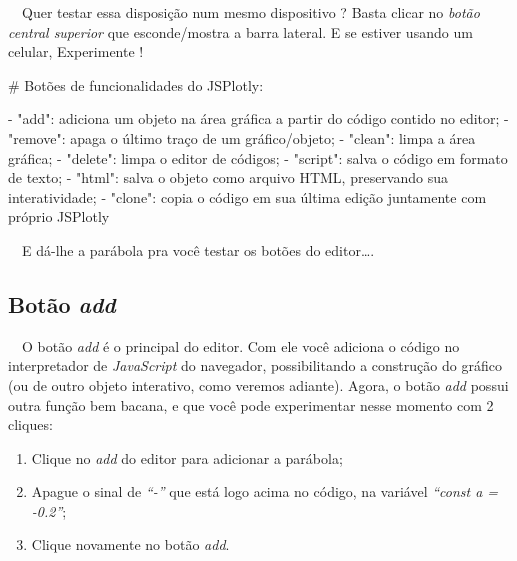 \documentclass[
  portuguese,
  letterpaper,
  DIV=11,
  numbers=noendperiod]{scrreprt}
\newenvironment{Shaded}{\begin{snugshade}}{\end{snugshade}}
\newcommand{\CommentTok}[1]{\textcolor[rgb]{0.37,0.37,0.37}{#1}}
\newcommand{\NormalTok}[1]{\textcolor[rgb]{0.00,0.23,0.31}{#1}}
\newcommand{\SpecialCharTok}[1]{\textcolor[rgb]{0.37,0.37,0.37}{#1}}
\newcommand{\StringTok}[1]{\textcolor[rgb]{0.13,0.47,0.30}{#1}}
\providecommand{\tightlist}{%
  \setlength{\itemsep}{0pt}\setlength{\parskip}{0pt}}
\begin{document}
~~Quer testar essa disposição num mesmo dispositivo ? Basta clicar no
\emph{botão central superior} que esconde/mostra a barra lateral. E se
estiver usando um celular, Experimente !

\begin{Shaded}
\begin{Highlighting}[]
\CommentTok{\# Botões de funcionalidades do JSPlotly:}

\SpecialCharTok{{-}} \StringTok{"add"}\SpecialCharTok{:}\NormalTok{ adiciona um objeto na área gráfica a partir do código contido no }
\NormalTok{   editor;}
\SpecialCharTok{{-}} \StringTok{"remove"}\SpecialCharTok{:}\NormalTok{ apaga o último traço de um gráfico}\SpecialCharTok{/}\NormalTok{objeto;}
\SpecialCharTok{{-}} \StringTok{"clean"}\SpecialCharTok{:}\NormalTok{ limpa a área gráfica;}
\SpecialCharTok{{-}} \StringTok{"delete"}\SpecialCharTok{:}\NormalTok{ limpa o editor de códigos;}
\SpecialCharTok{{-}} \StringTok{"script"}\SpecialCharTok{:}\NormalTok{ salva o código em formato de texto;}
\SpecialCharTok{{-}} \StringTok{"html"}\SpecialCharTok{:}\NormalTok{ salva o objeto como arquivo HTML, preservando sua interatividade;}
\SpecialCharTok{{-}} \StringTok{"clone"}\SpecialCharTok{:}\NormalTok{ copia o código em sua última edição juntamente com próprio JSPlotly}
\end{Highlighting}
\end{Shaded}

\hfill\break

~~E dá-lhe a parábola pra você testar os botões do editor\ldots.

\hfill\break

\hfill\break

\subsection{\texorpdfstring{Botão
\emph{add}}{Botão add}}\label{botuxe3o-add}

~~O botão \emph{add} é o principal do editor. Com ele você adiciona o
código no interpretador de \emph{JavaScript} do navegador,
possibilitando a construção do gráfico (ou de outro objeto interativo,
como veremos adiante). Agora, o botão \emph{add} possui outra função bem
bacana, e que você pode experimentar nesse momento com 2 cliques:

\hfill\break

\begin{enumerate}
\def\labelenumi{\arabic{enumi}.}
\tightlist
\item
  Clique no \emph{add} do editor para adicionar a parábola;
\item
  Apague o sinal de \emph{``-''} que está logo acima no código, na
  variável \emph{``const a = -0.2''};
\item
  Clique novamente no botão \emph{add}.\\
\end{enumerate}
\end{document}
